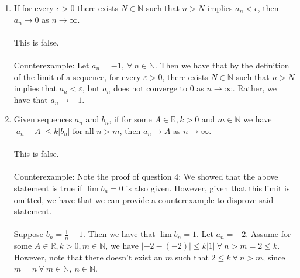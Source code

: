\documentclass[12pt,letterpaper]{article}
\newcommand{\R}{\mathbb{R}}
\newcommand{\N}{\mathbb{N}}
\theoremstyle{case}
\begin{document}
\begin{enumerate}
\begin{enumerate}
		\item If for every $\epsilon >0 $ there exists $N \in \mathbb{N}$ such that $n > N$ implies $a_n < \epsilon$, then $a_n \rightarrow 0$ as $n \rightarrow \infty$.
		\\\\This is false.
		\\\\Counterexample: Let $a_n = -1,\ \forall\ n \in \N$. Then we have that by the definition of the limit of a sequence, for every $\varepsilon > 0$, there exists $N \in \N$ such that $n > N$ implies that $a_n < \varepsilon$, but $a_n$ does not converge to 0 as $n \rightarrow \infty$. Rather, we have that $a_n \rightarrow -1$. 
		\item Given sequences $a_n$ and $b_n$, if for some $A \in \mathbb{R}, k > 0$ and $m \in \mathbb{N}$ we have $|a_n-A| \leq k|b_n|$ for all $n >m$, then $a_n \rightarrow A$ as $n \rightarrow \infty$.
		\\\\This is false.
		\\\\Counterexample: Note the proof of question 4: We showed that the above statement is true if $\lim b_n = 0$ is also given. However, given that this limit is omitted, we have that we can provide a counterexample to disprove said statement.
		\\\\Suppose $b_n=\frac{1}{n}+1$. Then we have that $\lim b_n=1$. Let $a_n=-2$. Assume for some $A \in \R, k>0, m \in \N$, we have $|-2 - (-2)| \leq k|1|\ \forall\ n > m = 2 \leq k$. However, note that there doesn't exist an $m$ such that $2 \leq k\ \forall\ n > m$, since $m=n\ \forall\ m \in \N,\ n \in \N$.
	\end{enumerate}
	\end{enumerate}
\end{document}
